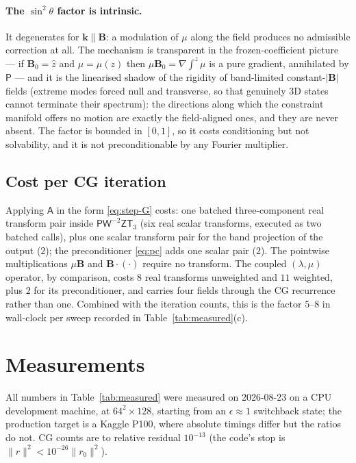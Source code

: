 \documentclass[11pt]{article}
\theoremstyle{definition}
\newcommand{\B}{\mathbf{B}}
\newcommand{\kk}{\mathbf{k}}
\newcommand{\Trr}{\mathsf{T}_3}
\newcommand{\Pl}{\mathsf{P}}
\newcommand{\Wm}{\mathsf{W}}
\newcommand{\Zf}{\mathsf{Z}}
\newcommand{\Aop}{\mathsf{A}}
\begin{document}
\paragraph{The $\sin^2\theta$ factor is intrinsic.} It degenerates for
$\kk\parallel\B$: a modulation of $\mu$ along the field produces no admissible
correction at all. The mechanism is transparent in the frozen-coefficient
picture --- if $\B_0=\hat z$ and $\mu=\mu(z)$ then
$\mu\B_0=\nabla\!\int^z\!\mu$ is a pure gradient, annihilated by $\Pl$ --- and
it is the linearised shadow of the rigidity of band-limited constant-$|\B|$
fields (extreme modes forced null and transverse, so that genuinely 3D states
cannot terminate their spectrum): the directions along which the constraint
manifold offers no motion are exactly the field-aligned ones, and they are
never absent. The factor is bounded in $[0,1]$, so it costs conditioning but
not solvability, and it is not preconditionable by any Fourier multiplier.

\subsection{Cost per CG iteration}

Applying $\Aop$ in the form \eqref{eq:step-G} costs: one batched
three-component real transform pair inside $\Pl\Wm^{-2}\Zf\Trr$ (six real
scalar transforms, executed as two batched calls), plus one scalar transform
pair for the band projection of the output ($2$); the preconditioner
\eqref{eq:pc} adds one scalar pair ($2$). The pointwise multiplications
$\mu\B$ and $\B\cdot(\cdot)$ require no transform. The coupled $(\lambda,\mu)$
operator, by comparison, costs $8$ real transforms unweighted and $11$
weighted, plus $2$ for its preconditioner, and carries four fields through the
CG recurrence rather than one. Combined with the iteration counts, this is the
factor $5$--$8$ in wall-clock per sweep recorded in
Table~\ref{tab:measured}(c).

\section{Measurements}\label{sec:measured}

All numbers in Table~\ref{tab:measured} were measured on 2026-08-23 on a CPU
development machine, at $64^2\times128$, starting from an $\epsilon\approx1$
switchback state; the production target is a Kaggle P100, where absolute
timings differ but the ratios do not. CG counts are to relative residual
$10^{-13}$ (the code's stop is $\|r\|^2<10^{-26}\|r_0\|^2$).
\end{document}
